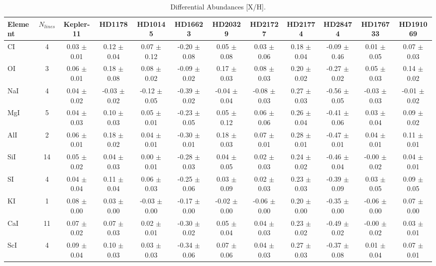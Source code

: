\documentclass[oneside]{emulateapj}
\begin{document}
\begin{table}
\caption{Differential Abundances [X/H].}
\label{tbl:abund}
\begin{tabular}{lccccccccccc} 
\hline    
\hline 
{Element} & $N_{lines}$ & Kepler-11 & HD1178 & HD10145 & HD16623 & HD20329 & HD21727 & HD21774 & HD28474 & HD176733 & HD191069 \\
\hline
CI & 4 & 0.03 $\pm$ 0.01 & 0.12 $\pm$ 0.04 & 0.07 $\pm$ 0.12 & -0.20 $\pm$ 0.08 & 0.05 $\pm$ 0.08 & 0.03 $\pm$ 0.06 & 0.18 $\pm$ 0.04 & -0.09 $\pm$ 0.46 & 0.01 $\pm$ 0.05 & 0.07 $\pm$ 0.03 \\
OI & 3 & 0.06 $\pm$ 0.01 & 0.18 $\pm$ 0.08 & 0.08 $\pm$ 0.02 & -0.09 $\pm$ 0.02 & 0.17 $\pm$ 0.03 & 0.08 $\pm$ 0.03 & 0.20 $\pm$ 0.02 & -0.27 $\pm$ 0.02 & 0.05 $\pm$ 0.03 & 0.14 $\pm$ 0.02 \\
NaI & 4 & 0.04 $\pm$ 0.02 & -0.03 $\pm$ 0.02 & -0.12 $\pm$ 0.05 & -0.39 $\pm$ 0.02 & -0.04 $\pm$ 0.04 & -0.08 $\pm$ 0.03 & 0.27 $\pm$ 0.03 & -0.56 $\pm$ 0.05 & -0.03 $\pm$ 0.03 & -0.01 $\pm$ 0.02 \\
MgI & 5 & 0.04 $\pm$ 0.03 & 0.10 $\pm$ 0.03 & 0.05 $\pm$ 0.01 & -0.23 $\pm$ 0.05 & 0.05 $\pm$ 0.12 & 0.06 $\pm$ 0.06 & 0.26 $\pm$ 0.04 & -0.41 $\pm$ 0.06 & 0.03 $\pm$ 0.04 & 0.09 $\pm$ 0.02 \\
AlI & 2 & 0.06 $\pm$ 0.01 & 0.18 $\pm$ 0.02 & 0.04 $\pm$ 0.01 & -0.30 $\pm$ 0.01 & 0.18 $\pm$ 0.03 & 0.07 $\pm$ 0.01 & 0.28 $\pm$ 0.01 & -0.47 $\pm$ 0.01 & 0.04 $\pm$ 0.01 & 0.11 $\pm$ 0.01 \\
SiI & 14 & 0.05 $\pm$ 0.02 & 0.04 $\pm$ 0.03 & 0.00 $\pm$ 0.01 & -0.28 $\pm$ 0.03 & 0.04 $\pm$ 0.05 & 0.02 $\pm$ 0.03 & 0.24 $\pm$ 0.02 & -0.46 $\pm$ 0.04 & -0.00 $\pm$ 0.02 & 0.04 $\pm$ 0.01 \\
SI & 4 & 0.04 $\pm$ 0.04 & 0.11 $\pm$ 0.04 & 0.06 $\pm$ 0.03 & -0.25 $\pm$ 0.06 & 0.03 $\pm$ 0.09 & 0.02 $\pm$ 0.03 & 0.23 $\pm$ 0.03 & -0.39 $\pm$ 0.09 & 0.03 $\pm$ 0.05 & 0.09 $\pm$ 0.05 \\
KI & 1 & 0.08 $\pm$ 0.00 & 0.03 $\pm$ 0.00 & -0.03 $\pm$ 0.00 & -0.17 $\pm$ 0.00 & -0.02 $\pm$ 0.00 & -0.06 $\pm$ 0.00 & 0.20 $\pm$ 0.00 & -0.35 $\pm$ 0.00 & -0.06 $\pm$ 0.00 & 0.07 $\pm$ 0.00 \\
CaI & 11 & 0.07 $\pm$ 0.02 & 0.07 $\pm$ 0.03 & 0.02 $\pm$ 0.01 & -0.30 $\pm$ 0.02 & 0.05 $\pm$ 0.04 & 0.04 $\pm$ 0.03 & 0.23 $\pm$ 0.02 & -0.49 $\pm$ 0.02 & -0.00 $\pm$ 0.02 & 0.03 $\pm$ 0.01 \\
ScI & 4 & 0.09 $\pm$ 0.04 & 0.10 $\pm$ 0.03 & 0.03 $\pm$ 0.03 & -0.34 $\pm$ 0.06 & 0.07 $\pm$ 0.06 & 0.04 $\pm$ 0.03 & 0.27 $\pm$ 0.03 & -0.37 $\pm$ 0.08 & 0.01 $\pm$ 0.04 & 0.07 $\pm$ 0.01 \\

\end{tabular}
\end{table}
\end{document}
